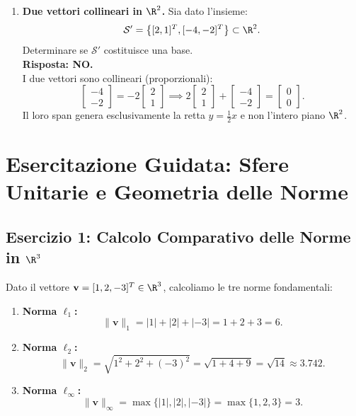 \begin{example}
\begin{enumerate}
    \item \textbf{Due vettori collineari in $\R^2$.} Sia dato l'insieme:
    \[
        \mathcal{S}' = \left\{ [2, 1]^T, [-4, -2]^T \right\} \subset \R^2.
    \]
    Determinare se $\mathcal{S}'$ costituisce una base. \\
    \textbf{Risposta: NO.} \\
    I due vettori sono collineari (proporzionali):
    \begin{equation}
        \begin{bmatrix} -4 \\ -2 \end{bmatrix} = -2 \begin{bmatrix} 2 \\ 1 \end{bmatrix} \implies 2 \begin{bmatrix} 2 \\ 1 \end{bmatrix} + \begin{bmatrix} -4 \\ -2 \end{bmatrix} = \begin{bmatrix} 0 \\ 0 \end{bmatrix}.
    \end{equation}
    Il loro span genera esclusivamente la retta $y = \frac{1}{2}x$ e non l'intero piano $\R^2$.
\end{enumerate}
\end{example}

\FloatBarrier
\section{Esercitazione Guidata: Sfere Unitarie e Geometria delle Norme}

\subsection{Esercizio 1: Calcolo Comparativo delle Norme in \texorpdfstring{$\R^3$}{R3}}
Dato il vettore $\mathbf{v} = [1, 2, -3]^T \in \R^3$, calcoliamo le tre norme fondamentali:
\begin{enumerate}
    \item \textbf{Norma $\ell_1$:}
    \begin{equation}
        \|\mathbf{v}\|_1 = |1| + |2| + |-3| = 1 + 2 + 3 = 6.
    \end{equation}
    \item \textbf{Norma $\ell_2$:}
    \begin{equation}
        \|\mathbf{v}\|_2 = \sqrt{1^2 + 2^2 + (-3)^2} = \sqrt{1 + 4 + 9} = \sqrt{14} \approx 3.742.
    \end{equation}
    \item \textbf{Norma $\ell_\infty$:}
    \begin{equation}
        \|\mathbf{v}\|_\infty = \max\{|1|, |2|, |-3|\} = \max\{1, 2, 3\} = 3.
    \end{equation}
\end{enumerate}

